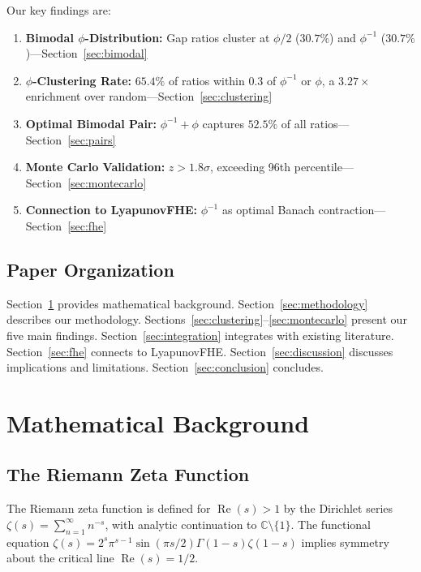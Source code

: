 \documentclass[11pt,a4paper]{article}
\DeclareMathOperator{\Rea}{Re}
\begin{document}
Our key findings are:
\begin{enumerate}[leftmargin=*,itemsep=2pt]
    \item \textbf{Bimodal $\phi$-Distribution:} Gap ratios cluster at $\phi/2$ ($30.7\%$) and $\phi^{-1}$ ($30.7\%$)—Section~\ref{sec:bimodal}
    \item \textbf{$\phi$-Clustering Rate:} $65.4\%$ of ratios within $0.3$ of $\phi^{-1}$ or $\phi$, a $3.27\times$ enrichment over random—Section~\ref{sec:clustering}
    \item \textbf{Optimal Bimodal Pair:} $\phi^{-1} + \phi$ captures $52.5\%$ of all ratios—Section~\ref{sec:pairs}
    \item \textbf{Monte Carlo Validation:} $z > 1.8\sigma$, exceeding 96th percentile—Section~\ref{sec:montecarlo}
    \item \textbf{Connection to LyapunovFHE:} $\phi^{-1}$ as optimal Banach contraction—Section~\ref{sec:fhe}
\end{enumerate}

\subsection{Paper Organization}

Section~\ref{sec:background} provides mathematical background. Section~\ref{sec:methodology} describes our methodology. Sections~\ref{sec:clustering}--\ref{sec:montecarlo} present our five main findings. Section~\ref{sec:integration} integrates with existing literature. Section~\ref{sec:fhe} connects to LyapunovFHE. Section~\ref{sec:discussion} discusses implications and limitations. Section~\ref{sec:conclusion} concludes.

\newpage

\section{Mathematical Background}
\label{sec:background}

\subsection{The Riemann Zeta Function}

The Riemann zeta function is defined for $\Rea(s) > 1$ by the Dirichlet series $\zeta(s) = \sum_{n=1}^{\infty} n^{-s}$, with analytic continuation to $\mathbb{C} \setminus \{1\}$. The functional equation $\zeta(s) = 2^s \pi^{s-1} \sin(\pi s/2) \Gamma(1-s) \zeta(1-s)$ implies symmetry about the critical line $\Rea(s) = 1/2$.
\end{document}
